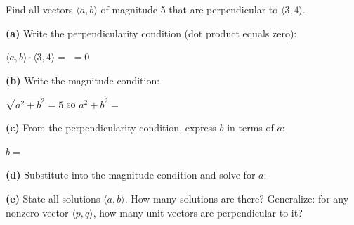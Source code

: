 \documentclass[10pt]{article}
\begin{document}
\begin{tcolorbox}[colback=white, colframe=black!40,
    title=\textbf{Tier E --- Extension},
    fonttitle=\bfseries, arc=2mm, left=3mm, right=3mm, top=2mm, bottom=2mm]
\small
Find all vectors $\langle a, b\rangle$ of magnitude 5 that are perpendicular to
$\langle 3, 4\rangle$.

\textbf{(a)} Write the perpendicularity condition (dot product equals zero):

\vspace{0.06in}
\hspace{1em} $\langle a,b\rangle \cdot \langle 3,4\rangle = $  $= 0$

\vspace{0.14in}
\textbf{(b)} Write the magnitude condition:

\vspace{0.06in}
\hspace{1em} $\sqrt{a^2 + b^2} = 5$ \quad so \quad $a^2 + b^2 = $ 

\vspace{0.14in}
\textbf{(c)} From the perpendicularity condition, express $b$ in terms of $a$:

\vspace{0.06in}
\hspace{1em} $b = $ 

\vspace{0.14in}
\textbf{(d)} Substitute into the magnitude condition and solve for $a$:


\textbf{(e)} State all solutions $\langle a,b\rangle$. How many solutions are there?
Generalize: for any nonzero vector $\langle p,q\rangle$, how many unit vectors are
perpendicular to it?

\end{tcolorbox}
\end{document}
